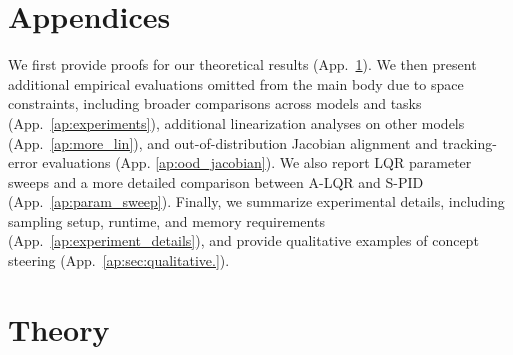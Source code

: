 \documentclass{article}
\theoremstyle{plain}
\theoremstyle{definition}
\theoremstyle{remark}
\begin{document}
\newpage



\newpage
\appendix
\onecolumn

\section*{Appendices}
We first provide proofs for our theoretical results (App.~\ref{proofs}). We then present additional empirical evaluations omitted from the main body due to space constraints, including broader comparisons across models and tasks (App.~\ref{ap:experiments}), additional linearization analyses on other models (App.~\ref{ap:more_lin}), and out-of-distribution Jacobian alignment and tracking-error evaluations (App. \ref{ap:ood_jacobian}). We also report LQR parameter sweeps and a more detailed comparison between A-LQR and S-PID (App.~\ref{ap:param_sweep}). Finally, we summarize experimental details, including sampling setup, runtime, and memory requirements (App.~\ref{ap:experiment_details}), and provide qualitative examples of concept steering (App.~\ref{ap:sec:qualitative.}).

\section{Theory}\label{proofs}
\end{document}
